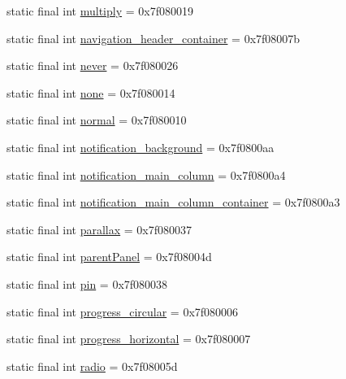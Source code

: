 \begin{CompactItemize}
static final int \hyperlink{classandroid_1_1support_1_1v7_1_1palette_1_1_r_1_1id_3b0a826f3fa1774f83a2505f633686aa}{multiply} = 0x7f080019
\item 
static final int \hyperlink{classandroid_1_1support_1_1v7_1_1palette_1_1_r_1_1id_3be168b068764434a765099ba7f3a846}{navigation\_\-header\_\-container} = 0x7f08007b
\item 
static final int \hyperlink{classandroid_1_1support_1_1v7_1_1palette_1_1_r_1_1id_22899744825926944af4aa2b31a65d5f}{never} = 0x7f080026
\item 
static final int \hyperlink{classandroid_1_1support_1_1v7_1_1palette_1_1_r_1_1id_4c8a24662848ab758f453710f06657c6}{none} = 0x7f080014
\item 
static final int \hyperlink{classandroid_1_1support_1_1v7_1_1palette_1_1_r_1_1id_c2bae328e3b469614d99c841aa5781a0}{normal} = 0x7f080010
\item 
static final int \hyperlink{classandroid_1_1support_1_1v7_1_1palette_1_1_r_1_1id_cdd4d284d1d33f8a78d78213c090211c}{notification\_\-background} = 0x7f0800aa
\item 
static final int \hyperlink{classandroid_1_1support_1_1v7_1_1palette_1_1_r_1_1id_67ba3b67c4ccd3c91912999452a0477e}{notification\_\-main\_\-column} = 0x7f0800a4
\item 
static final int \hyperlink{classandroid_1_1support_1_1v7_1_1palette_1_1_r_1_1id_6660885642124d0f529fda89966128f7}{notification\_\-main\_\-column\_\-container} = 0x7f0800a3
\item 
static final int \hyperlink{classandroid_1_1support_1_1v7_1_1palette_1_1_r_1_1id_e229d63b22a00d98afcbb7d2d26ed552}{parallax} = 0x7f080037
\item 
static final int \hyperlink{classandroid_1_1support_1_1v7_1_1palette_1_1_r_1_1id_3b878bdb189525595abfe4efbef2507b}{parentPanel} = 0x7f08004d
\item 
static final int \hyperlink{classandroid_1_1support_1_1v7_1_1palette_1_1_r_1_1id_2d9954003119340339f6f2102ff15b7c}{pin} = 0x7f080038
\item 
static final int \hyperlink{classandroid_1_1support_1_1v7_1_1palette_1_1_r_1_1id_ebdbc2b49ceebf7079adb8108470de74}{progress\_\-circular} = 0x7f080006
\item 
static final int \hyperlink{classandroid_1_1support_1_1v7_1_1palette_1_1_r_1_1id_ecf16bb9cb416572d72aae4f7ba0f6c7}{progress\_\-horizontal} = 0x7f080007
\item 
static final int \hyperlink{classandroid_1_1support_1_1v7_1_1palette_1_1_r_1_1id_809220de629c80ce61aee1a2fea2fe21}{radio} = 0x7f08005d

\end{CompactItemize}
